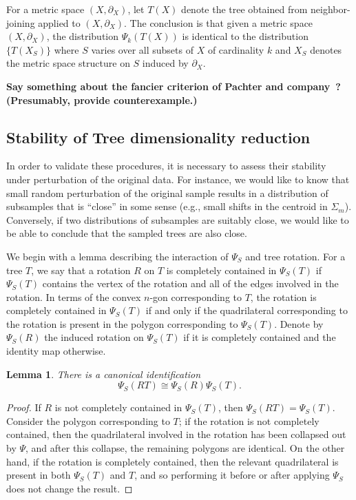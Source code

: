 \documentclass[a4paper,11pt]{article}
\newtheorem{lemma}{Lemma}
\begin{document}
For a metric space $(X,\partial_X)$, let $T(X)$ denote the tree obtained from neighbor-joining applied to $(X,\partial_X)$.
The conclusion is that given a metric space $(X, \partial_X)$, the distribution $\Psi_k(T(X))$ is identical to the distribution $\{T(X_S)\}$ where $S$ varies over all subsets of $X$ of cardinality $k$ and $X_S$ denotes the metric space structure on $S$ induced by $\partial_X$.

{\bf Say something about the fancier criterion of Pachter and company~\cite{}?  (Presumably, provide counterexample.)}

\subsection{Stability of Tree dimensionality reduction}

In order to validate these procedures, it is necessary to assess their stability under perturbation of the original data.
For instance, we would like to know that small random perturbation of the original sample results in a distribution of subsamples that is ``close'' in some sense (e.g., small shifts in the centroid in $\Sigma_m$).
Conversely, if two distributions of subsamples are suitably close, we would like to be able to conclude that the sampled trees are also close.

We begin with a lemma describing the interaction of $\Psi_S$ and tree rotation.
For a tree $T$, we say that a rotation $R$ on $T$ is completely contained in $\Psi_S(T)$ if $\Psi_S(T)$ contains the vertex of the rotation and all of the edges involved in the rotation.
In terms of the convex $n$-gon corresponding to $T$, the rotation is completely contained in $\Psi_S(T)$ if and only if the quadrilateral corresponding to the rotation is present in the polygon corresponding to $\Psi_S(T)$.
Denote by $\Psi_S(R)$ the induced rotation on $\Psi_S(T)$ if it is completely contained and the identity map otherwise.

\begin{lemma}\label{lem:rotprojcom}
There is a canonical identification
\[
\Psi_S(RT) \cong \Psi_S(R) \Psi_S(T).
\]
\end{lemma}

\begin{proof}
If $R$ is not completely contained in $\Psi_S(T)$, then $\Psi_S(RT) = \Psi_S(T)$.
Consider the polygon corresponding to $T$; if the rotation is not completely contained, then the quadrilateral involved in the rotation has been collapsed out by $\Psi$, and after this collapse, the remaining polygons are identical.
On the other hand, if the rotation is completely contained, then the relevant quadrilateral is present in both $\Psi_S(T)$ and $T$, and so performing it before or after applying $\Psi_S$ does not change the result.
\end{proof}
\end{document}
